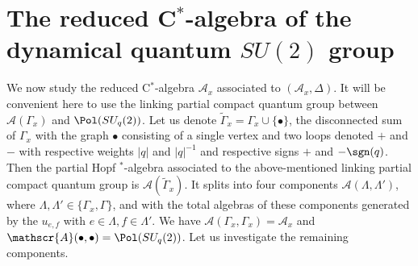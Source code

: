 




\section{The reduced C$^*$-algebra of the dynamical quantum $SU(2)$ group}

We now study the reduced C$^*$-algebra $\mathcal{A}_x$ associated to $(\mathscr{A}_x,\Delta)$. It will be convenient here to use the linking partial compact quantum group between $\mathscr{A}(\Gamma_x)$ and $\Pol(SU_q(2))$.  Let us denote $\widetilde{\Gamma}_x = \Gamma_x\cup \{\bullet\}$, the disconnected sum of $\Gamma_x$ with the graph $\bullet$ consisting of a single vertex and two loops denoted $+$ and $-$ with respective weights $|q|$ and $|q|^{-1}$ and respective signs $+$ and $-\sgn(q)$. Then the partial Hopf $^*$-algebra associated to the above-mentioned linking partial compact quantum group is $\mathscr{A}(\widetilde{\Gamma}_x)$. It splits into four components $\mathscr{A}(\Lambda,\Lambda')$, where $\Lambda,\Lambda' \in \{\Gamma_x,\Gamma\}$, and with the total algebras of these components generated by the $u_{e,f}$ with $e \in \Lambda,f\in \Lambda'$. We have $\mathscr{A}(\Gamma_x,\Gamma_x) = \mathscr{A}_x$ and $\mathscr{A}(\bullet,\bullet) = \Pol(SU_q(2))$. Let us investigate the remaining components.

